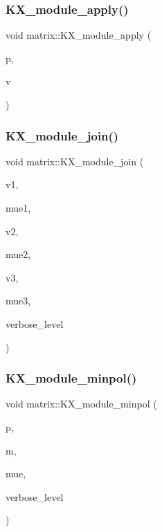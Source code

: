 \subsubsection{\texorpdfstring{K\+X\+\_\+module\+\_\+apply()}{KX\_module\_apply()}}
{\footnotesize\ttfamily void matrix\+::\+K\+X\+\_\+module\+\_\+apply (\begin{DoxyParamCaption}\item[{\mbox{\hyperlink{classunipoly}{unipoly}} \&}]{p,  }\item[{\mbox{\hyperlink{class_vector}{Vector}} \&}]{v }\end{DoxyParamCaption})}

\mbox{\label{classmatrix_afd55b3b44c36f039928862315f52428b}} 
\subsubsection{\texorpdfstring{K\+X\+\_\+module\+\_\+join()}{KX\_module\_join()}}
{\footnotesize\ttfamily void matrix\+::\+K\+X\+\_\+module\+\_\+join (\begin{DoxyParamCaption}\item[{\mbox{\hyperlink{class_vector}{Vector}} \&}]{v1,  }\item[{\mbox{\hyperlink{classunipoly}{unipoly}} \&}]{mue1,  }\item[{\mbox{\hyperlink{class_vector}{Vector}} \&}]{v2,  }\item[{\mbox{\hyperlink{classunipoly}{unipoly}} \&}]{mue2,  }\item[{\mbox{\hyperlink{class_vector}{Vector}} \&}]{v3,  }\item[{\mbox{\hyperlink{classunipoly}{unipoly}} \&}]{mue3,  }\item[{\mbox{\hyperlink{galois_8h_a09fddde158a3a20bd2dcadb609de11dc}{I\+NT}}}]{verbose\+\_\+level }\end{DoxyParamCaption})}

\mbox{\label{classmatrix_ad8b6174329495126b165154d074bbcff}} 
\subsubsection{\texorpdfstring{K\+X\+\_\+module\+\_\+minpol()}{KX\_module\_minpol()}}
{\footnotesize\ttfamily void matrix\+::\+K\+X\+\_\+module\+\_\+minpol (\begin{DoxyParamCaption}\item[{\mbox{\hyperlink{classunipoly}{unipoly}} \&}]{p,  }\item[{\mbox{\hyperlink{classunipoly}{unipoly}} \&}]{m,  }\item[{\mbox{\hyperlink{classunipoly}{unipoly}} \&}]{mue,  }\item[{\mbox{\hyperlink{galois_8h_a09fddde158a3a20bd2dcadb609de11dc}{I\+NT}}}]{verbose\+\_\+level }\end{DoxyParamCaption})}

